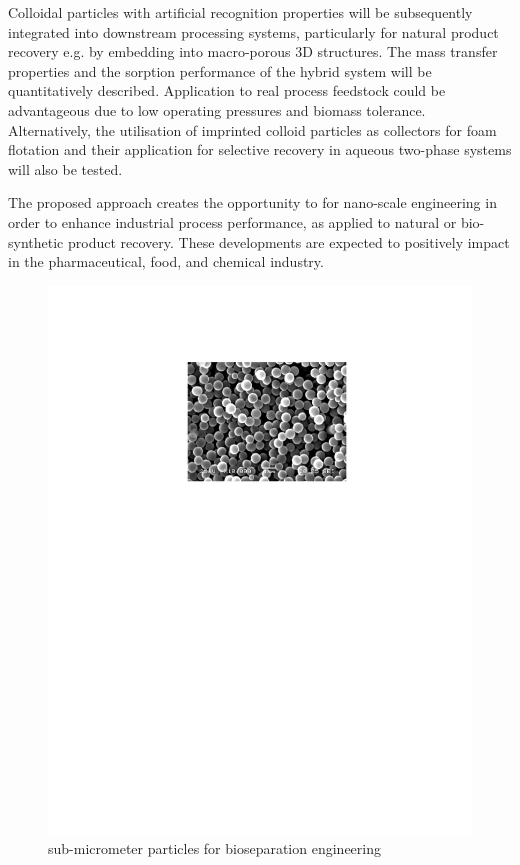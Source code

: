 Colloidal particles with artificial recognition properties will be
subsequently integrated into downstream processing systems,
particularly for natural product recovery e.g. by embedding into
macro-porous 3D structures. The mass transfer properties and the
sorption performance of the hybrid system will be quantitatively
described. Application to real process feedstock could be
advantageous due to low operating pressures and biomass tolerance.
Alternatively, the utilisation of imprinted colloid particles as
collectors for foam flotation and their application for selective
recovery in aqueous two-phase systems will also be tested.

The proposed approach creates the opportunity to for nano-scale
engineering in order to enhance industrial process performance, as
applied to natural or bio-synthetic product recovery. These
developments are expected to positively impact in the
pharmaceutical, food, and chemical industry.




\begin{figure}[ht]
  \begin{center}
   \includegraphics[width=\hsize]{Fernandez-Lahore/lahore_picture.pdf}
    \caption{sub-micrometer particles for bioseparation engineering}
     \end{center}
\end{figure}

